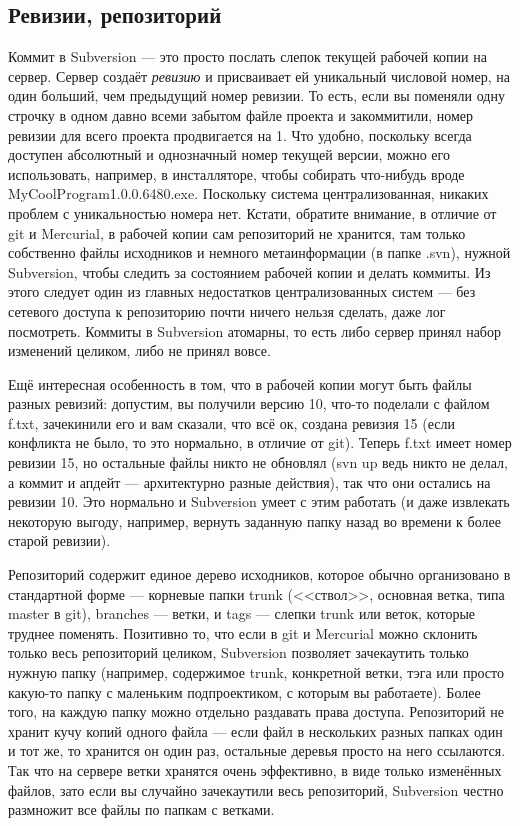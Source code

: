 \documentclass{../../text-style}
\begin{document}
\subsection{Ревизии, репозиторий}

Коммит в Subversion --- это просто послать слепок текущей рабочей копии на сервер. Сервер создаёт \textit{ревизию} и присваивает ей уникальный числовой номер, на один больший, чем предыдущий номер ревизии. То есть, если вы поменяли одну строчку в одном давно всеми забытом файле проекта и закоммитили, номер ревизии для всего проекта продвигается на 1. Что удобно, поскольку всегда доступен абсолютный и однозначный номер текущей версии, можно его использовать, например, в инсталляторе, чтобы собирать что-нибудь вроде MyCoolProgram1.0.0.6480.exe. Поскольку система централизованная, никаких проблем с уникальностью номера нет. Кстати, обратите внимание, в отличие от git и Mercurial, в рабочей копии сам репозиторий не хранится, там только собственно файлы исходников и немного метаинформации (в папке .svn), нужной Subversion, чтобы следить за состоянием рабочей копии и делать коммиты. Из этого следует один из главных недостатков централизованных систем --- без сетевого доступа к репозиторию почти ничего нельзя сделать, даже лог посмотреть. Коммиты в Subversion атомарны, то есть либо сервер принял набор изменений целиком, либо не принял вовсе. 

Ещё интересная особенность в том, что в рабочей копии могут быть файлы разных ревизий: допустим, вы получили версию 10, что-то поделали с файлом f.txt, зачекинили его и вам сказали, что всё ок, создана ревизия 15 (если конфликта не было, то это нормально, в отличие от git). Теперь f.txt имеет номер ревизии 15, но остальные файлы никто не обновлял (svn up ведь никто не делал, а коммит и апдейт --- архитектурно разные действия), так что они остались на ревизии 10. Это нормально и Subversion умеет с этим работать (и даже извлекать некоторую выгоду, например, вернуть заданную папку назад во времени к более старой ревизии).

Репозиторий содержит единое дерево исходников, которое обычно организовано в стандартной форме --- корневые папки trunk (<<ствол>>, основная ветка, типа master в git), branches --- ветки, и tags --- слепки trunk или веток, которые труднее поменять. Позитивно то, что если в git и Mercurial можно склонить только весь репозиторий целиком, Subversion позволяет зачекаутить только нужную папку (например, содержимое trunk, конкретной ветки, тэга или просто какую-то папку с маленьким подпроектиком, с которым вы работаете). Более того, на каждую папку можно отдельно раздавать права доступа. Репозиторий не хранит кучу копий одного файла --- если файл в нескольких разных папках один и тот же, то хранится он один раз, остальные деревья просто на него ссылаются. Так что на сервере ветки хранятся очень эффективно, в виде только изменённых файлов, зато если вы случайно зачекаутили весь репозиторий, Subversion честно размножит все файлы по папкам с ветками.
\end{document}
